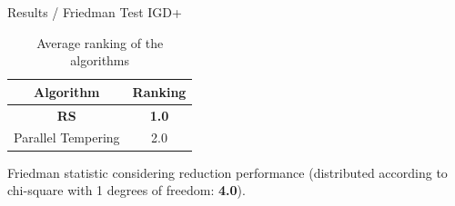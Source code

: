 \documentclass{beamer}
\begin{document}
    \begin{frame}{Results / Friedman Test IGD+}
        \begin{table}[!htp]
            \centering
            \caption{Average ranking of the algorithms}
            \begin{tabular}{c|c}
            Algorithm&Ranking\\
            \hline
            \textbf{RS}&\textbf{1.0}\\
            Parallel Tempering&2.0\\
            \end{tabular}
        \end{table}
    
    
        Friedman statistic considering reduction performance (distributed according to chi-square with 1 degrees of freedom: \textbf{4.0}).
    \end{frame}
    
\end{document}
